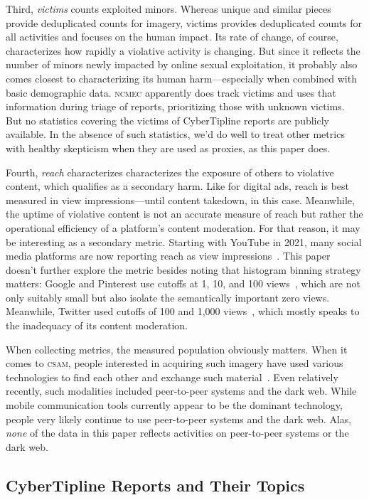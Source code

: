 \documentclass[nonacm,screen]{acmart}
\newcommand\V[1]{\textsc{\MakeLowercase{#1}}}
\begin{document}
\begin{itemize}
{Third, \emph{victims} counts exploited minors. Whereas unique and similar pieces
provide deduplicated counts for imagery, victims provides deduplicated counts
for all activities and focuses on the human impact. Its rate of change, of
course, characterizes how rapidly a violative activity is changing. But since it
reflects the number of minors newly impacted by online sexual exploitation, it
probably also comes closest to characterizing its human harm---especially when
combined with basic demographic data. \V{NCMEC} apparently does track victims
and uses that information during triage of reports, prioritizing those with
unknown victims. But no statistics covering the victims of CyberTipline reports
are publicly available. In the absence of such statistics, we'd do well to treat
other metrics with healthy skepticism when they are used as proxies, as this
paper does.

Fourth, \emph{reach} characterizes characterizes the exposure of others to
violative content, which qualifies as a secondary harm. Like for digital ads,
reach is best measured in view impressions---until content takedown, in this
case. Meanwhile, the uptime of violative content is not an accurate measure of
reach but rather the operational efficiency of a platform's content moderation.
For that reason, it may be interesting as a secondary metric. Starting with
YouTube in 2021, many social media platforms are now reporting reach as view
impressions~\cite{OConnor2021}. This paper doesn't further explore the metric
besides noting that histogram binning strategy matters: Google and Pinterest use
cutoffs at 1, 10, and 100 views~\cite{Google2022,Pinterest2022}, which are not
only suitably small but also isolate the semantically important zero views.
Meanwhile, Twitter used cutoffs of 100 and 1,000 views~\cite{Twitter2022}, which
mostly speaks to the inadequacy of its content moderation.

When collecting metrics, the measured population obviously matters. When it
comes to \V{CSAM}, people interested in acquiring such imagery have used various
technologies to find each other and exchange such
material~\cite{SteelNewmanea2020}. Even relatively recently, such modalities
included peer-to-peer systems and the dark web. While mobile communication tools
currently appear to be the dominant technology, people very likely continue to
use peer-to-peer systems and the dark web. Alas, \emph{none} of the data in this
paper reflects activities on peer-to-peer systems or the dark web.


\subsection{CyberTipline Reports and Their Topics}
\label{sec:report-contents}

}
\end{itemize}
\end{document}
